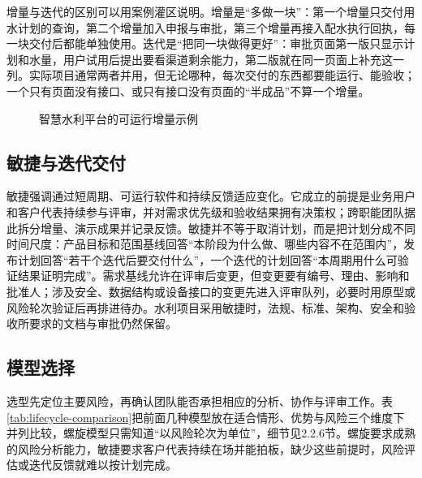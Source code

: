增量与迭代的区别可以用案例灌区说明。增量是“多做一块”：第一个增量只交付用水计划的查询，第二个增量加入申报与审批，第三个增量再接入配水执行回执，每一块交付后都能单独使用。迭代是“把同一块做得更好”：审批页面第一版只显示计划和水量，用户试用后提出要看渠道剩余能力，第二版就在同一页面上补充这一列。实际项目通常两者并用，但无论哪种，每次交付的东西都要能运行、能验收；一个只有页面没有接口、或只有接口没有页面的“半成品”不算一个增量。

\begin{figure}[htbp]
\centering
{}
\caption{智慧水利平台的可运行增量示例}
\label{fig:incremental-model}
\end{figure}

\subsection{敏捷与迭代交付}

敏捷强调通过短周期、可运行软件和持续反馈适应变化\cite{agile2001}。它成立的前提是业务用户和客户代表持续参与评审，并对需求优先级和验收结果拥有决策权；跨职能团队据此拆分增量、演示成果并记录反馈。敏捷并不等于取消计划，而是把计划分成不同时间尺度：产品目标和范围基线回答“本阶段为什么做、哪些内容不在范围内”，发布计划回答“若干个迭代后要交付什么”，一个迭代的计划回答“本周期用什么可验证结果证明完成”。需求基线允许在评审后变更，但变更要有编号、理由、影响和批准人；涉及安全、数据结构或设备接口的变更先进入评审队列，必要时用原型或风险轮次验证后再排进待办。水利项目采用敏捷时，法规、标准、架构、安全和验收所要求的文档与审批仍然保留。

\subsection{模型选择}

选型先定位主要风险，再确认团队能否承担相应的分析、协作与评审工作。表\ref{tab:lifecycle-comparison}把前面几种模型放在适合情形、优势与风险三个维度下并列比较，螺旋模型只需知道“以风险轮次为单位”，细节见2.2.6节。螺旋要求成熟的风险分析能力，敏捷要求客户代表持续在场并能拍板，缺少这些前提时，风险评估或迭代反馈就难以按计划完成。

